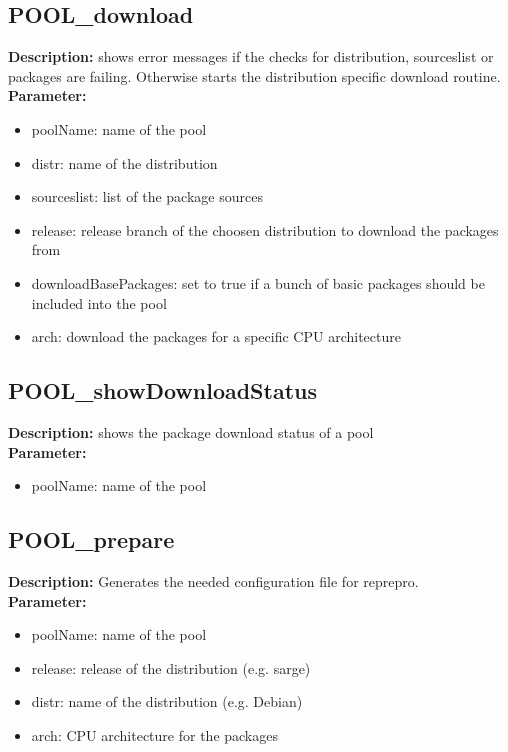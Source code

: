 \subsection{POOL\_download}
\textbf{Description:} shows error messages if the checks for distribution, sourceslist or packages are failing. Otherwise starts the distribution specific download routine.\\
\textbf{Parameter:}
\begin{itemize}
\item poolName: name of the pool
\item distr: name of the distribution
\item sourceslist: list of the package sources
\item release: release branch of the choosen distribution to download the packages from
\item downloadBasePackages: set to true if a bunch of basic packages should be included into the pool
\item arch: download the packages for a specific CPU architecture
\end{itemize}

\subsection{POOL\_showDownloadStatus}
\textbf{Description:} shows the package download status of a pool\\
\textbf{Parameter:}
\begin{itemize}
\item poolName: name of the pool
\end{itemize}

\subsection{POOL\_prepare}
\textbf{Description:} Generates the needed configuration file for reprepro.\\
\textbf{Parameter:}
\begin{itemize}
\item poolName: name of the pool
\item release: release of the distribution (e.g. sarge)
\item distr: name of the distribution (e.g. Debian)
\item arch: CPU architecture for the packages
\end{itemize}

